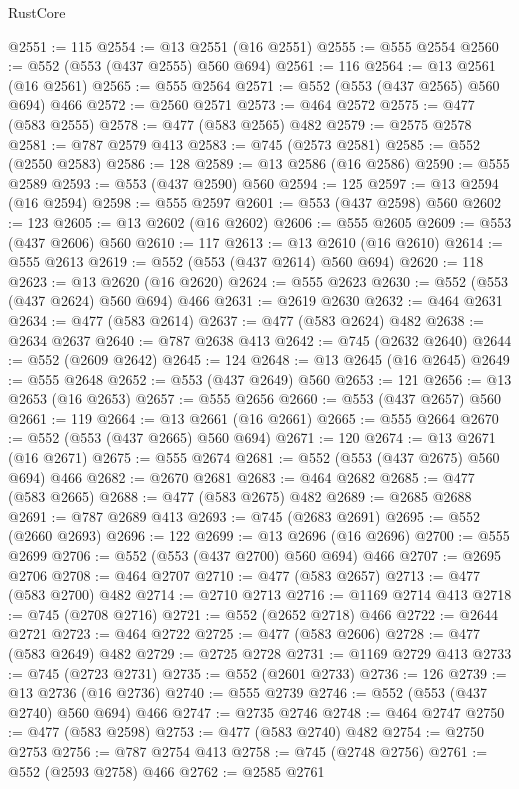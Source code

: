 \begin{lexlean}{RustCore}
\begin{coremodule}
@2551 := 115
@2554 := @13 @2551 (@16 @2551)
@2555 := @555 @2554
@2560 := @552 (@553 (@437 @2555) @560 @694)
@2561 := 116
@2564 := @13 @2561 (@16 @2561)
@2565 := @555 @2564
@2571 := @552 (@553 (@437 @2565) @560 @694) @466
@2572 := @2560 @2571
@2573 := @464 @2572
@2575 := @477 (@583 @2555)
@2578 := @477 (@583 @2565) @482
@2579 := @2575 @2578
@2581 := @787 @2579 @413
@2583 := @745 (@2573 @2581)
@2585 := @552 (@2550 @2583)
@2586 := 128
@2589 := @13 @2586 (@16 @2586)
@2590 := @555 @2589
@2593 := @553 (@437 @2590) @560
@2594 := 125
@2597 := @13 @2594 (@16 @2594)
@2598 := @555 @2597
@2601 := @553 (@437 @2598) @560
@2602 := 123
@2605 := @13 @2602 (@16 @2602)
@2606 := @555 @2605
@2609 := @553 (@437 @2606) @560
@2610 := 117
@2613 := @13 @2610 (@16 @2610)
@2614 := @555 @2613
@2619 := @552 (@553 (@437 @2614) @560 @694)
@2620 := 118
@2623 := @13 @2620 (@16 @2620)
@2624 := @555 @2623
@2630 := @552 (@553 (@437 @2624) @560 @694) @466
@2631 := @2619 @2630
@2632 := @464 @2631
@2634 := @477 (@583 @2614)
@2637 := @477 (@583 @2624) @482
@2638 := @2634 @2637
@2640 := @787 @2638 @413
@2642 := @745 (@2632 @2640)
@2644 := @552 (@2609 @2642)
@2645 := 124
@2648 := @13 @2645 (@16 @2645)
@2649 := @555 @2648
@2652 := @553 (@437 @2649) @560
@2653 := 121
@2656 := @13 @2653 (@16 @2653)
@2657 := @555 @2656
@2660 := @553 (@437 @2657) @560
@2661 := 119
@2664 := @13 @2661 (@16 @2661)
@2665 := @555 @2664
@2670 := @552 (@553 (@437 @2665) @560 @694)
@2671 := 120
@2674 := @13 @2671 (@16 @2671)
@2675 := @555 @2674
@2681 := @552 (@553 (@437 @2675) @560 @694) @466
@2682 := @2670 @2681
@2683 := @464 @2682
@2685 := @477 (@583 @2665)
@2688 := @477 (@583 @2675) @482
@2689 := @2685 @2688
@2691 := @787 @2689 @413
@2693 := @745 (@2683 @2691)
@2695 := @552 (@2660 @2693)
@2696 := 122
@2699 := @13 @2696 (@16 @2696)
@2700 := @555 @2699
@2706 := @552 (@553 (@437 @2700) @560 @694) @466
@2707 := @2695 @2706
@2708 := @464 @2707
@2710 := @477 (@583 @2657)
@2713 := @477 (@583 @2700) @482
@2714 := @2710 @2713
@2716 := @1169 @2714 @413
@2718 := @745 (@2708 @2716)
@2721 := @552 (@2652 @2718) @466
@2722 := @2644 @2721
@2723 := @464 @2722
@2725 := @477 (@583 @2606)
@2728 := @477 (@583 @2649) @482
@2729 := @2725 @2728
@2731 := @1169 @2729 @413
@2733 := @745 (@2723 @2731)
@2735 := @552 (@2601 @2733)
@2736 := 126
@2739 := @13 @2736 (@16 @2736)
@2740 := @555 @2739
@2746 := @552 (@553 (@437 @2740) @560 @694) @466
@2747 := @2735 @2746
@2748 := @464 @2747
@2750 := @477 (@583 @2598)
@2753 := @477 (@583 @2740) @482
@2754 := @2750 @2753
@2756 := @787 @2754 @413
@2758 := @745 (@2748 @2756)
@2761 := @552 (@2593 @2758) @466
@2762 := @2585 @2761

\end{coremodule}
\end{lexlean}
